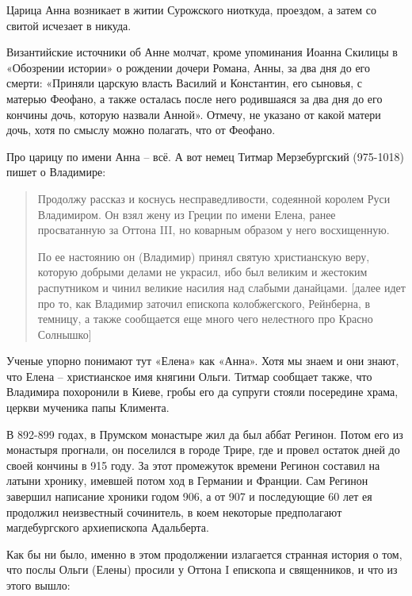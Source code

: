 Царица Анна возникает в житии Сурожского ниоткуда, проездом, а затем со свитой исчезает в никуда.

Византийские источники об Анне молчат, кроме упоминания Иоанна Скилицы в «Обозрении истории» о рождении дочери Романа, Анны, за два дня до его смерти: «Приняли царскую власть Василий и Константин, его сыновья, с матерью Феофано, а также осталась после него родившаяся за два дня до его кончины дочь, которую назвали Анной». Отмечу, не указано от какой матери дочь, хотя по смыслу можно полагать, что от Феофано.

Про царицу по имени Анна – всё. А вот немец Титмар Мерзебургский (975-1018) пишет о Владимире\cite{nazarenco01}:

\begin{quotation}
Продолжу рассказ и коснусь несправедливости, содеянной королем Руси Владимиром. Он взял жену из Греции по имени Елена, ранее просватанную за Оттона III, но коварным образом у него восхищенную.

По ее настоянию он (Владимир) принял святую христианскую веру, которую добрыми делами не украсил, ибо был великим и жестоким распутником и чинил великие насилия над слабыми данайцами. [далее идет про то, как Владимир заточил епископа колобжегского, Рейнберна, в темницу, а также сообщается еще много чего нелестного про Красно Солнышко]
\end{quotation}

Ученые упорно понимают тут «Елена» как «Анна». Хотя мы знаем и они знают, что Елена – христианское имя княгини Ольги. Титмар сообщает также, что Владимира похоронили в Киеве, гробы его да супруги стояли посередине храма, церкви мученика папы Климента.

В 892-899 годах, в Прумском монастыре жил да был аббат Регинон. Потом его из монастыря прогнали, он поселился в городе Трире, где и провел остаток дней до своей кончины в 915 году. За этот промежуток времени Регинон составил на латыни хронику, имевшей потом ход в Германии и Франции. Сам Регинон завершил написание хроники годом 906, а от 907 и последующие 60 лет ея продолжил неизвестный сочинитель, в коем некоторые предполагают магдебургского архиепископа Адальберта. 

Как бы ни было, именно в этом продолжении\cite{nazarenco01} излагается странная история о том, что послы Ольги (Елены) просили у Оттона I епископа и священников, и что из этого вышло:

